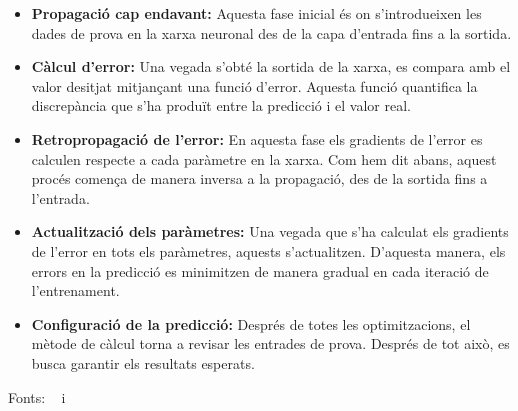 \begin{itemize}
    \item \textbf{Propagació cap endavant:} Aquesta fase inicial és on s'introdueixen les dades de prova en la xarxa neuronal des de la capa d'entrada fins a la sortida.

    \item \textbf{Càlcul d'error:} Una vegada s'obté la sortida de la xarxa, es compara amb el valor desitjat mitjançant una funció d'error. Aquesta funció quantifica la discrepància que s'ha produït entre la predicció i el valor real.

    \item \textbf{Retropropagació de l'error:} En aquesta fase els gradients de l'error es calculen respecte a cada paràmetre en la xarxa. Com hem dit abans, aquest procés comença de manera inversa a la propagació, des de la sortida fins a l'entrada.

    \item \textbf{Actualització dels paràmetres:} Una vegada que s'ha calculat els gradients de l'error en tots els paràmetres, aquests s'actualitzen. D'aquesta manera, els errors en la predicció es minimitzen de manera gradual en cada iteració de l'entrenament.

    \item \textbf{Configuració de la predicció:} Després de totes les optimitzacions, el mètode de càlcul torna a revisar les entrades de prova. Després de tot això, es busca garantir els resultats esperats.
\end{itemize}

Fonts: ~\cite{valencia} i~\cite{Retropropagacio}
